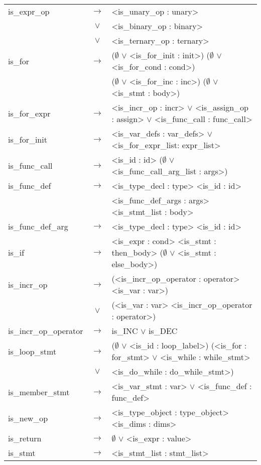 \documentclass[a4paper]{article}
\begin{document}
\begin{longtable}{lcl}
	is\_expr\_op				& $\to$ & <is\_unary\_op : unary> \\
								& $\vee$ & <is\_binary\_op : binary>\\
								& $\vee$ & <is\_ternary\_op : ternary>\\
	is\_for						& $\to$ & ($\emptyset$ $\vee$ <is\_for\_init : init>) ($\emptyset$ $\vee$ <is\_for\_cond : cond>) \\ %
								&       & ($\emptyset$ $\vee$ <is\_for\_inc : inc>) ($\emptyset$ $\vee$ <is\_stmt : body>) \\
	is\_for\_expr				& $\to$ & <is\_incr\_op : incr> $\vee$ <is\_assign\_op : assign> $\vee$ <is\_func\_call : func\_call> \\
	is\_for\_init				& $\to$ & <is\_var\_defs : var\_defs> $\vee$ <is\_for\_expr\_list: expr\_list> \\
	is\_func\_call				& $\to$ & <is\_id : id> ($\emptyset$ $\vee$ <is\_func\_call\_arg\_list : args>) \\
	is\_func\_def				& $\to$ & <is\_type\_decl : type> <is\_id : id> \\ %
								&       & <is\_func\_def\_args : args> <is\_stmt\_list : body> \\
	is\_func\_def\_arg			& $\to$ & <is\_type\_decl : type> <is\_id : id> \\
	is\_if						& $\to$ & <is\_expr : cond> <is\_stmt : then\_body> ($\emptyset$ $\vee$ <is\_stmt : else\_body>) \\
	is\_incr\_op				& $\to$ &(<is\_incr\_op\_operator : operator> <is\_var : var>) \\
								& $\vee$ & (<is\_var : var> <is\_incr\_op\_operator : operator>) \\
	is\_incr\_op\_operator		& $\to$ & is\_INC $\vee$ is\_DEC \\
	is\_loop\_stmt				& $\to$ & ($\emptyset$ $\vee$ <is\_id : loop\_label>) (<is\_for : for\_stmt> $\vee$ <is\_while : while\_stmt> \\ 
								& $\vee$ & <is\_do\_while : do\_while\_stmt>) \\
	is\_member\_stmt			& $\to$ & <is\_var\_stmt : var> $\vee$ <is\_func\_def : func\_def> \\
	is\_new\_op					& $\to$ & <is\_type\_object : type\_object> <is\_dims : dims> \\
	is\_return					& $\to$ & $\emptyset$ $\vee$ <is\_expr : value> \\
	is\_stmt					& $\to$ & <is\_stmt\_list : stmt\_list> \\

\end{longtable}
\end{document}
